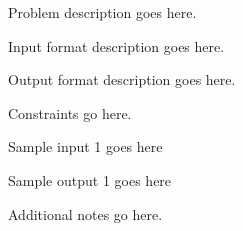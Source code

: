 
\begin{problemstatement}
Problem description goes here.
\end{problemstatement}

\begin{inputformat}
Input format description goes here.
\end{inputformat}

\begin{outputformat}
Output format description goes here.
\end{outputformat}

\begin{constraints}
Constraints go here.
\end{constraints}

\begin{sampleinput}
Sample input 1 goes here
\end{sampleinput}

\begin{sampleoutput}
Sample output 1 goes here
\end{sampleoutput}

\begin{notes}
Additional notes go here.
\end{notes}
